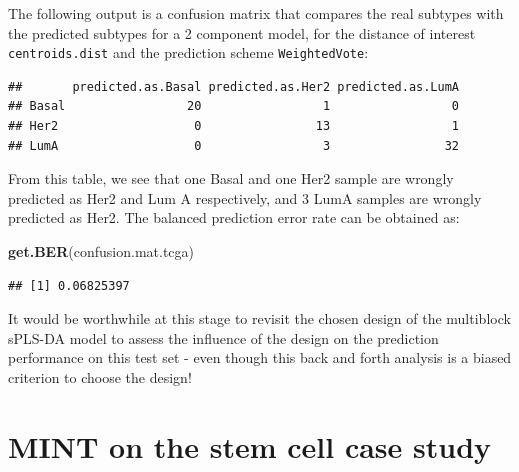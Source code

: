 \documentclass[]{book}
\newenvironment{Shaded}{\begin{snugshade}}{\end{snugshade}}
\newcommand{\DataTypeTok}[1]{\textcolor[rgb]{0.13,0.29,0.53}{#1}}
\newcommand{\DecValTok}[1]{\textcolor[rgb]{0.00,0.00,0.81}{#1}}
\newcommand{\KeywordTok}[1]{\textcolor[rgb]{0.13,0.29,0.53}{\textbf{#1}}}
\newcommand{\NormalTok}[1]{#1}
\newcommand{\OperatorTok}[1]{\textcolor[rgb]{0.81,0.36,0.00}{\textbf{#1}}}
\newcommand{\StringTok}[1]{\textcolor[rgb]{0.31,0.60,0.02}{#1}}
\begin{document}
The following output is a confusion matrix that compares the real subtypes with the predicted subtypes for a 2 component model, for the distance of interest \texttt{centroids.dist} and the prediction scheme \texttt{WeightedVote}:

\begin{Shaded}
\end{Shaded}

\begin{verbatim}
##       predicted.as.Basal predicted.as.Her2 predicted.as.LumA
## Basal                 20                 1                 0
## Her2                   0                13                 1
## LumA                   0                 3                32
\end{verbatim}

From this table, we see that one Basal and one Her2 sample are wrongly predicted as Her2 and Lum A respectively, and 3 LumA samples are wrongly predicted as Her2. The balanced prediction error rate can be obtained as:

\begin{Shaded}
\begin{Highlighting}[]
\KeywordTok{get.BER}\NormalTok{(confusion.mat.tcga)}
\end{Highlighting}
\end{Shaded}

\begin{verbatim}
## [1] 0.06825397
\end{verbatim}

It would be worthwhile at this stage to revisit the chosen design of the multiblock sPLS-DA model to assess the influence of the design on the prediction performance on this test set - even though this back and forth analysis is a biased criterion to choose the design!

\hypertarget{mint-stemcell-case}{%
\chapter{MINT on the stem cell case study}\label{mint-stemcell-case}}
\end{document}

